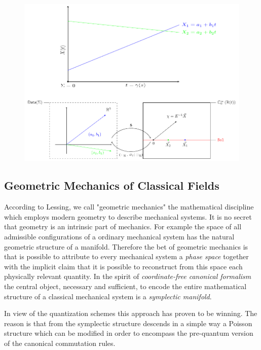 \documentclass[Main]{subfiles}
\begin{document}
		\begin{figure}[h!]
			\includegraphics[width=\textwidth]{Pictures/Jacobi1D_GeometricPicturePanoramica}	
			\caption{ 
			}	
		\end{figure}		


	\subsection{Geometric Mechanics of Classical Fields}
		According to Lessing\cite{Lessig2012}, we call "geometric mechanics" the mathematical discipline which employs modern geometry to describe mechanical systems.
		It is no secret that geometry is an intrinsic part of mechanics. For example the space of all admissible configurations of a ordinary mechanical system has the natural geometric structure of a manifold.
		Therefore the bet of geometric mechanics is that is possible to attribute to every mechanical system a  \emph{phase space} together with the implicit claim that it is possible to reconstruct from this space each physically relevant quantity.%
		In the spirit of \emph{coordinate-free canonical formalism} the central object, necessary and sufficient, to encode the entire mathematical structure of a classical mechanical system is a \emph{symplectic manifold}.


		In view of the quantization schemes this approach has proven to be winning.
		The reason is that from the symplectic structure descends in a simple way a Poisson structure which can be modified in order to encompass the pre-quantum version of the canonical commutation rules.
\end{document}
